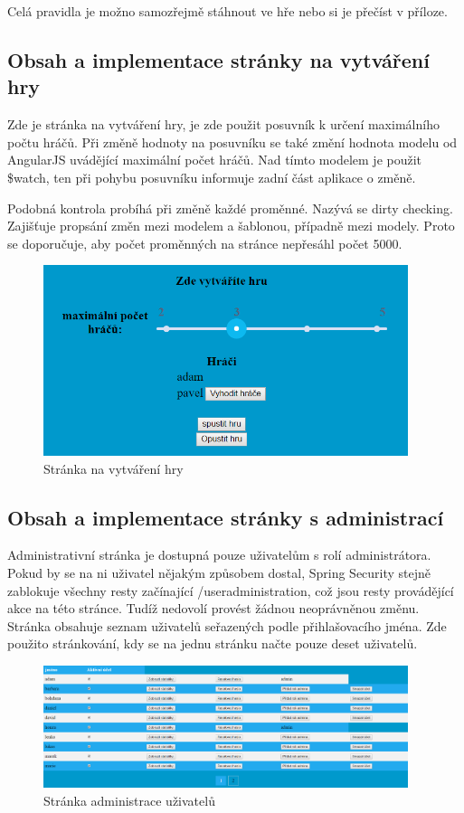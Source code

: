 \documentclass[czech,master,public,dept460,male,cpdeclaration,twoside]{diploma}
\begin{document}
Celá pravidla je možno samozřejmě stáhnout ve hře nebo si je přečíst v příloze.

\subsection{Obsah a implementace stránky na vytváření hry}
Zde je stránka na vytváření hry, je zde použit posuvník k určení maximálního počtu hráčů. Při změně hodnoty na posuvníku se také změní hodnota modelu od AngularJS uvádějící maximální počet hráčů. Nad tímto modelem je použit \$watch, ten při pohybu posuvníku informuje zadní část aplikace o změně.

Podobná kontrola probíhá při změně každé proměnné. Nazývá se dirty checking. Zajišťuje propsání změn mezi modelem a šablonou, případně mezi modely. Proto se doporučuje, aby počet proměnných na stránce nepřesáhl počet 5000.
\begin{figure}[H]
\centering\includegraphics[width=0.95\textwidth]{Figures/gamecreationpage.png}\caption{Stránka na vytváření hry}
\end{figure}

\subsection{Obsah a implementace stránky s administrací}
Administrativní stránka je dostupná pouze uživatelům s rolí administrátora. Pokud by se na ni uživatel nějakým způsobem dostal, Spring Security stejně zablokuje všechny resty začínající /useradministration, což jsou resty provádějící akce na této stránce. Tudíž nedovolí provést žádnou neoprávněnou změnu. Stránka obsahuje seznam uživatelů seřazených podle přihlašovacího jména. Zde použito stránkování, kdy se na jednu stránku načte pouze deset uživatelů.

\begin{figure}[H]
\centering\includegraphics[width=0.95\textwidth]{Figures/administrationpage.png}\caption{Stránka administrace uživatelů}
\end{figure}
\end{document}
